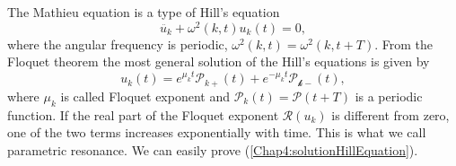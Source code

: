 \documentclass[11pt,a4paper,twoside]{book}
\begin{document}
The Mathieu equation is a type of Hill's equation
\begin{equation}
	\label{Chap4:Mathieu_HillEquation}
	\ddot{u_{k}} + \omega^{2}(k,t)u_{k}(t) = 0,
\end{equation}
where the angular frequency is periodic, $ \omega^{2}(k,t)=\omega^{2}(k,t+T) $.
From the Floquet theorem the most general solution of the Hill's equations is given by
\begin{equation}
\label{Chap4:solutionHillEquation}
u_{k}(t) = e^{\mu_{k}t}\mathcal{P}_{k+}(t) + e^{-\mu_{k}t}\mathcal{P_{k-}}(t),
\end{equation}
where $\mu_{k}$ is called Floquet exponent and $\mathcal{P}_{k}(t)=\mathcal{P}(t+T)$ is a periodic function. If the real part of the Floquet exponent $\mathcal{R}(u_{k}) $ is different from zero, one of the two terms increases exponentially with time. This is what we call parametric resonance. We can easily prove (\ref{Chap4:solutionHillEquation}).
\end{document}
